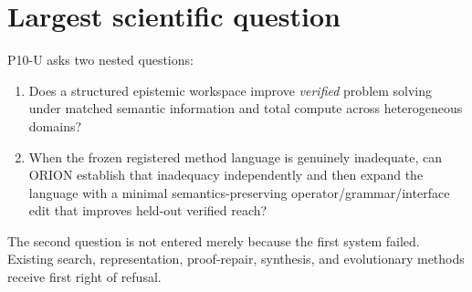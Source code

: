 \section{Largest scientific question}
P10-U asks two nested questions:
\begin{enumerate}
    \item Does a structured epistemic workspace improve \emph{verified} problem solving under matched semantic information and total compute across heterogeneous domains?
    \item When the frozen registered method language is genuinely inadequate, can ORION establish that inadequacy independently and then expand the language with a minimal semantics-preserving operator/grammar/interface edit that improves held-out verified reach?
\end{enumerate}
The second question is not entered merely because the first system failed. Existing search, representation, proof-repair, synthesis, and evolutionary methods receive first right of refusal.

